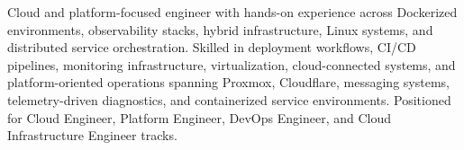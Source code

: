 Cloud and platform-focused engineer with hands-on experience across Dockerized environments, observability stacks, hybrid infrastructure, Linux systems, and distributed service orchestration. Skilled in deployment workflows, CI/CD pipelines, monitoring infrastructure, virtualization, cloud-connected systems, and platform-oriented operations spanning Proxmox, Cloudflare, messaging systems, telemetry-driven diagnostics, and containerized service environments. Positioned for Cloud Engineer, Platform Engineer, DevOps Engineer, and Cloud Infrastructure Engineer tracks.
